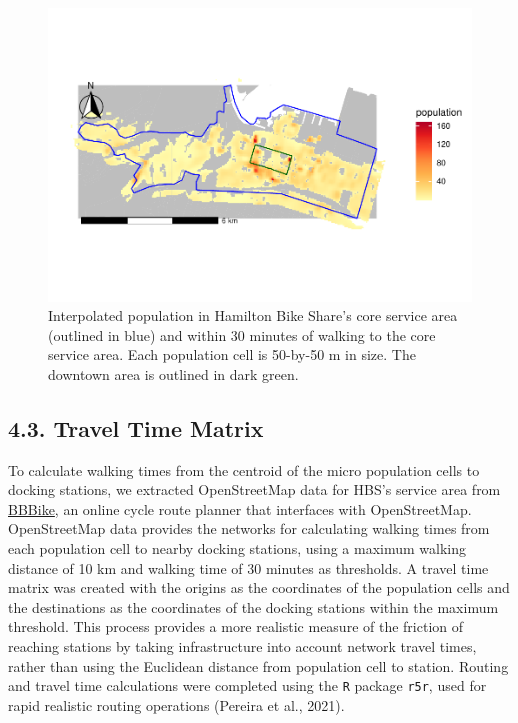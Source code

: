 \documentclass[]{elsarticle} %
\begin{document}
\begin{figure}

{\centering \includegraphics[width=0.9\linewidth]{Bike-share-spatial-equity-R1_files/figure-latex/interpolated-population-1} 

}

\caption{Interpolated population in Hamilton Bike Share's core service area (outlined in blue) and within 30 minutes of walking to the core service area. Each population cell is 50-by-50 m in size. The downtown area is outlined in dark green.}\label{fig:interpolated-population}
\end{figure}

\hypertarget{travel-time-matrix}{%
\subsection{4.3. Travel Time Matrix}\label{travel-time-matrix}}

To calculate walking times from the centroid of the micro population
cells to docking stations, we extracted OpenStreetMap data for HBS's
service area from
\href{https://download.bbbike.org/osm/bbbike/}{BBBike}, an online cycle
route planner that interfaces with OpenStreetMap. OpenStreetMap data
provides the networks for calculating walking times from each population
cell to nearby docking stations, using a maximum walking distance of 10
km and walking time of 30 minutes as thresholds. A travel time matrix
was created with the origins as the coordinates of the population cells
and the destinations as the coordinates of the docking stations within
the maximum threshold. This process provides a more realistic measure of
the friction of reaching stations by taking infrastructure into account
network travel times, rather than using the Euclidean distance from
population cell to station. Routing and travel time calculations were
completed using the \texttt{R} package \texttt{r5r}, used for rapid
realistic routing operations (Pereira et al., 2021).
\end{document}
